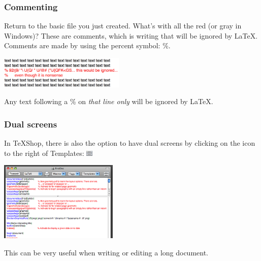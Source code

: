 \documentclass[slidestop,compress,mathserif]{beamer}
\begin{document}
\begin{frame} \frametitle{Commenting}
Return to the basic file you just created. What's with all the red (or gray in Windows)? These are comments, which is writing that will be ignored by LaTeX. Comments are made by using the percent symbol: {\color{comment}\%}.
\begin{center}
\includegraphics[height=0.6in]{basicsOfLatex/gettingStarted/commenting}
\end{center}
Any text following a {\color{comment}\%} on \emph{that line only} will be ignored by LaTeX.
\end{frame}


\begin{frame} \frametitle{Dual screens}
In TeXShop, there is also the option to have dual screens by clicking on the icon to the right of {\color{highlight}Templates}: \includegraphics[height=0.25cm]{basicsOfLatex/gettingStarted/dualScreenIcon}
\begin{center}
\includegraphics[height=1.5in]{basicsOfLatex/gettingStarted/dualScreens}
\end{center}
This can be very useful when writing or editing a long document.
\end{frame}
\end{document}
